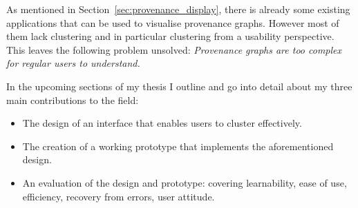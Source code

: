 As mentioned in Section~\ref{sec:provenance_display}, there is already some existing applications that can be used to visualise provenance graphs. However most of them lack clustering and in particular clustering from a usability perspective. This leaves the following problem unsolved: \textit{Provenance graphs are too complex for regular users to understand.} 

In the upcoming sections of my thesis I outline and go into detail about my three main contributions to the field:

\begin{itemize}
	\item The design of an interface that enables users to cluster effectively.
	\item The creation of a working prototype that implements the aforementioned design.
	\item An evaluation of the design and prototype: covering learnability, ease of use, efficiency, recovery from errors, user attitude.
\end{itemize}
